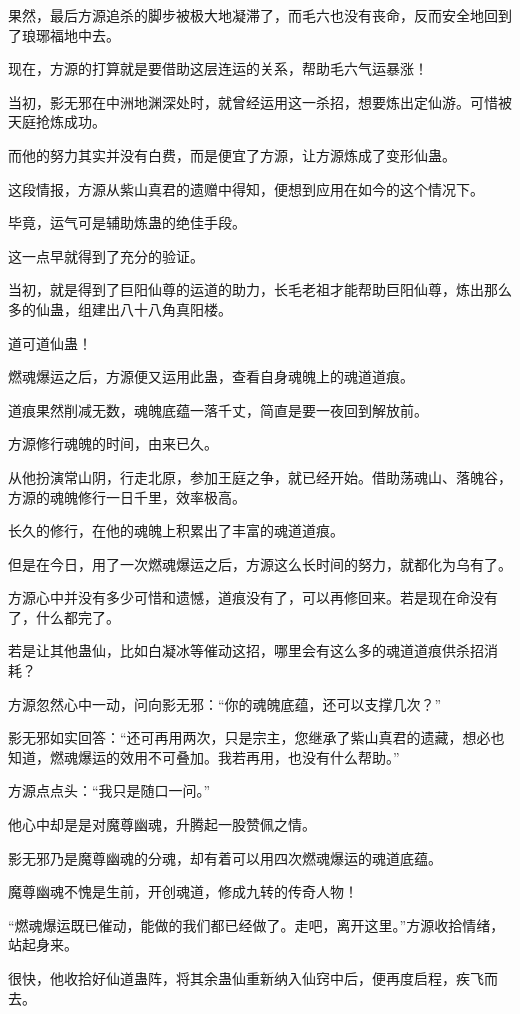 \begin{this_body}
果然，最后方源追杀的脚步被极大地凝滞了，而毛六也没有丧命，反而安全地回到了琅琊福地中去。

现在，方源的打算就是要借助这层连运的关系，帮助毛六气运暴涨！

当初，影无邪在中洲地渊深处时，就曾经运用这一杀招，想要炼出定仙游。可惜被天庭抢炼成功。

而他的努力其实并没有白费，而是便宜了方源，让方源炼成了变形仙蛊。

这段情报，方源从紫山真君的遗赠中得知，便想到应用在如今的这个情况下。

毕竟，运气可是辅助炼蛊的绝佳手段。

这一点早就得到了充分的验证。

当初，就是得到了巨阳仙尊的运道的助力，长毛老祖才能帮助巨阳仙尊，炼出那么多的仙蛊，组建出八十八角真阳楼。

道可道仙蛊！

燃魂爆运之后，方源便又运用此蛊，查看自身魂魄上的魂道道痕。

道痕果然削减无数，魂魄底蕴一落千丈，简直是要一夜回到解放前。

方源修行魂魄的时间，由来已久。

从他扮演常山阴，行走北原，参加王庭之争，就已经开始。借助荡魂山、落魄谷，方源的魂魄修行一日千里，效率极高。

长久的修行，在他的魂魄上积累出了丰富的魂道道痕。

但是在今日，用了一次燃魂爆运之后，方源这么长时间的努力，就都化为乌有了。

方源心中并没有多少可惜和遗憾，道痕没有了，可以再修回来。若是现在命没有了，什么都完了。

若是让其他蛊仙，比如白凝冰等催动这招，哪里会有这么多的魂道道痕供杀招消耗？

方源忽然心中一动，问向影无邪：“你的魂魄底蕴，还可以支撑几次？”

影无邪如实回答：“还可再用两次，只是宗主，您继承了紫山真君的遗藏，想必也知道，燃魂爆运的效用不可叠加。我若再用，也没有什么帮助。”

方源点点头：“我只是随口一问。”

他心中却是是对魔尊幽魂，升腾起一股赞佩之情。

影无邪乃是魔尊幽魂的分魂，却有着可以用四次燃魂爆运的魂道底蕴。

魔尊幽魂不愧是生前，开创魂道，修成九转的传奇人物！

“燃魂爆运既已催动，能做的我们都已经做了。走吧，离开这里。”方源收拾情绪，站起身来。

很快，他收拾好仙道蛊阵，将其余蛊仙重新纳入仙窍中后，便再度启程，疾飞而去。


\end{this_body}
